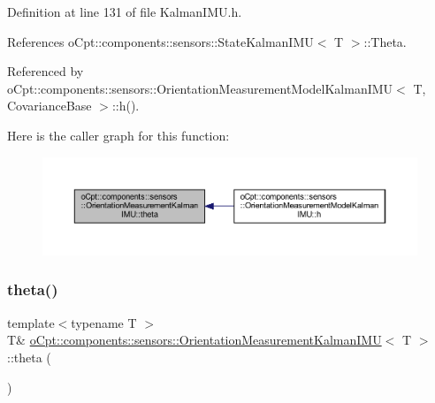 Definition at line 131 of file Kalman\+I\+M\+U.\+h.



References o\+Cpt\+::components\+::sensors\+::\+State\+Kalman\+I\+M\+U$<$ T $>$\+::\+Theta.



Referenced by o\+Cpt\+::components\+::sensors\+::\+Orientation\+Measurement\+Model\+Kalman\+I\+M\+U$<$ T, Covariance\+Base $>$\+::h().

Here is the caller graph for this function\+:
\nopagebreak
\begin{figure}[H]
\begin{center}
\leavevmode
\includegraphics[width=350pt]{classo_cpt_1_1components_1_1sensors_1_1_orientation_measurement_kalman_i_m_u_a40e67cce56f1ac577ad2f0aef699aaaa_icgraph}
\end{center}
\end{figure}
\hypertarget{classo_cpt_1_1components_1_1sensors_1_1_orientation_measurement_kalman_i_m_u_a93927ee51bc5993c9fc7cfa825a0bdb5}{}\label{classo_cpt_1_1components_1_1sensors_1_1_orientation_measurement_kalman_i_m_u_a93927ee51bc5993c9fc7cfa825a0bdb5} 
\subsubsection{\texorpdfstring{theta()}{theta()}\hspace{0.1cm}{\footnotesize\ttfamily [2/2]}}
{\footnotesize\ttfamily template$<$typename T $>$ \\
T\& \hyperlink{classo_cpt_1_1components_1_1sensors_1_1_orientation_measurement_kalman_i_m_u}{o\+Cpt\+::components\+::sensors\+::\+Orientation\+Measurement\+Kalman\+I\+MU}$<$ T $>$\+::theta (\begin{DoxyParamCaption}{ }\end{DoxyParamCaption})\hspace{0.3cm}{\ttfamily [inline]}}



